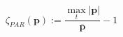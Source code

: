 \begin{equation}
	\zeta_{PAR}(\textbf{p}) := \frac{\max_t|\textbf{p}|}{\overline{\textbf{p}}} - 1%
	\label{ch2:equ:cost-par}
\end{equation}